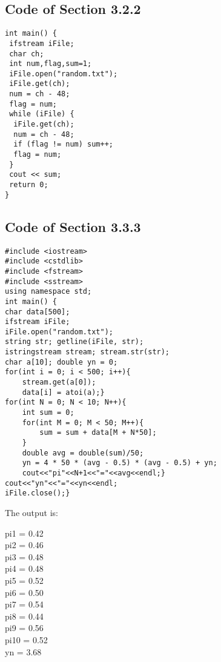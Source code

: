 \documentclass[a4paper,12pt]{article}
\begin{document}
\subsection{Code of Section 3.2.2}
\begin{tcolorbox}[title = {Find the Number of Runs},colframe = orange!70!white, colback = orange!5!white]
\begin{verbatim}
int main() {
 ifstream iFile;
 char ch;
 int num,flag,sum=1;
 iFile.open("random.txt");
 iFile.get(ch);
 num = ch - 48;
 flag = num;
 while (iFile) {
  iFile.get(ch);
  num = ch - 48;
  if (flag != num) sum++;
  flag = num;
 }
 cout << sum;
 return 0;
}
\end{verbatim}
\end{tcolorbox}
\subsection{Code of Section 3.3.3}
\begin{tcolorbox}[title = {Calculation Code},colframe = blue!80!white, colback = blue!5!white]
\begin{verbatim}
#include <iostream>
#include <cstdlib>
#include <fstream>
#include <sstream>
using namespace std;
int main() {
char data[500];
ifstream iFile;
iFile.open("random.txt");
string str; getline(iFile, str);
istringstream stream; stream.str(str);
char a[10]; double yn = 0;
for(int i = 0; i < 500; i++){
    stream.get(a[0]);
    data[i] = atoi(a);}
for(int N = 0; N < 10; N++){
    int sum = 0;
    for(int M = 0; M < 50; M++){
        sum = sum + data[M + N*50];
    }
    double avg = double(sum)/50;
    yn = 4 * 50 * (avg - 0.5) * (avg - 0.5) + yn;
    cout<<"pi"<<N+1<<"="<<avg<<endl;}
cout<<"yn"<<"="<<yn<<endl;
iFile.close();}
\end{verbatim}
\end{tcolorbox}

\noindent The output is:\\
\begin{tcolorbox}[title = {Result},colframe = red!80!white, colback = red!5!white]
pi1 = 0.42\\
pi2 = 0.46\\
pi3 = 0.48\\
pi4 = 0.48\\
pi5 = 0.52\\
pi6 = 0.50\\
pi7 = 0.54\\
pi8 = 0.44\\
pi9 = 0.56\\
pi10 = 0.52\\
yn = 3.68
\end{tcolorbox}
\end{document}
